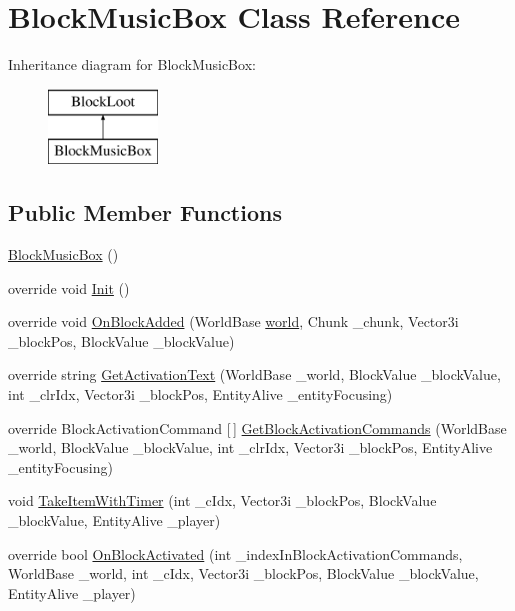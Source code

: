 \hypertarget{class_block_music_box}{}\section{Block\+Music\+Box Class Reference}
\label{class_block_music_box}
Inheritance diagram for Block\+Music\+Box\+:\begin{figure}[H]
\begin{center}
\leavevmode
\includegraphics[height=2.000000cm]{class_block_music_box}
\end{center}
\end{figure}
\subsection*{Public Member Functions}
\begin{DoxyCompactItemize}
\item 
\mbox{\hyperlink{class_block_music_box_aa9e724a3213f8d198ceb0516a9c3908c}{Block\+Music\+Box}} ()
\item 
override void \mbox{\hyperlink{class_block_music_box_a918cf2f3e7bf4e142d8eed610d611604}{Init}} ()
\item 
override void \mbox{\hyperlink{class_block_music_box_a219b49bc87eaaf1273ebb4159ed37b2a}{On\+Block\+Added}} (World\+Base \mbox{\hyperlink{_sphere_i_i_01_music_01_boxes_2_config_2_localization_8txt_a7ede01351426b1b7f6c1ce5f794e474f}{world}}, Chunk \+\_\+chunk, Vector3i \+\_\+block\+Pos, Block\+Value \+\_\+block\+Value)
\item 
override string \mbox{\hyperlink{class_block_music_box_a294e5968eee60a142c725730257750e3}{Get\+Activation\+Text}} (World\+Base \+\_\+world, Block\+Value \+\_\+block\+Value, int \+\_\+clr\+Idx, Vector3i \+\_\+block\+Pos, Entity\+Alive \+\_\+entity\+Focusing)
\item 
override Block\+Activation\+Command \mbox{[}$\,$\mbox{]} \mbox{\hyperlink{class_block_music_box_a59de4b1cf03b0f6f1f601ab02aa8e064}{Get\+Block\+Activation\+Commands}} (World\+Base \+\_\+world, Block\+Value \+\_\+block\+Value, int \+\_\+clr\+Idx, Vector3i \+\_\+block\+Pos, Entity\+Alive \+\_\+entity\+Focusing)
\item 
void \mbox{\hyperlink{class_block_music_box_ad6371ea130708e5b9ca3cdc1f8ec5206}{Take\+Item\+With\+Timer}} (int \+\_\+c\+Idx, Vector3i \+\_\+block\+Pos, Block\+Value \+\_\+block\+Value, Entity\+Alive \+\_\+player)
\item 
override bool \mbox{\hyperlink{class_block_music_box_aa9c10407f1ca52c9e4b7d83645581d21}{On\+Block\+Activated}} (int \+\_\+index\+In\+Block\+Activation\+Commands, World\+Base \+\_\+world, int \+\_\+c\+Idx, Vector3i \+\_\+block\+Pos, Block\+Value \+\_\+block\+Value, Entity\+Alive \+\_\+player)
\end{DoxyCompactItemize}


